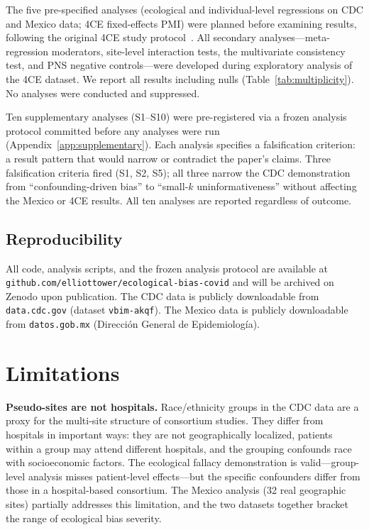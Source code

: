 \documentclass{article}
\begin{document}
The five pre-specified analyses (ecological and individual-level
regressions on CDC and Mexico data; 4CE fixed-effects PMI) were planned
before examining results, following the original 4CE study
protocol~\cite{four_ce_neuro2021}.  All secondary analyses---meta-regression
moderators, site-level interaction tests, the multivariate consistency
test, and PNS negative controls---were developed during exploratory
analysis of the 4CE dataset.  We report all results including nulls
(Table~\ref{tab:multiplicity}).  No analyses were conducted and suppressed.

Ten supplementary analyses (S1--S10) were pre-registered via a frozen
analysis protocol committed before any analyses were run
(Appendix~\ref{app:supplementary}).  Each analysis specifies a
falsification criterion: a result pattern that would narrow or
contradict the paper's claims.  Three falsification criteria fired
(S1, S2, S5); all three narrow the CDC demonstration from
``confounding-driven bias'' to ``small-$k$ uninformativeness'' without
affecting the Mexico or 4CE results.  All ten analyses are reported
regardless of outcome.

\subsection{Reproducibility}

All code, analysis scripts, and the frozen analysis protocol are
available at
\texttt{github.com/elliottower/ecological-bias-covid}
and will be archived on Zenodo upon publication.
The CDC data is publicly downloadable from \texttt{data.cdc.gov} (dataset
\texttt{vbim-akqf}).  The Mexico data is publicly downloadable from
\texttt{datos.gob.mx} (Direcci\'{o}n General de Epidemiolog\'{i}a).


\section{Limitations}

\textbf{Pseudo-sites are not hospitals.}  Race/ethnicity groups in the CDC
data are a proxy for the multi-site structure of consortium studies.  They
differ from hospitals in important ways: they are not geographically
localized, patients within a group may attend different hospitals, and the
grouping confounds race with socioeconomic factors.  The ecological fallacy
demonstration is valid---group-level analysis misses patient-level
effects---but the specific confounders differ from those in a hospital-based
consortium.  The Mexico analysis (32 real geographic sites) partially
addresses this limitation, and the two datasets together bracket the range
of ecological bias severity.
\end{document}
